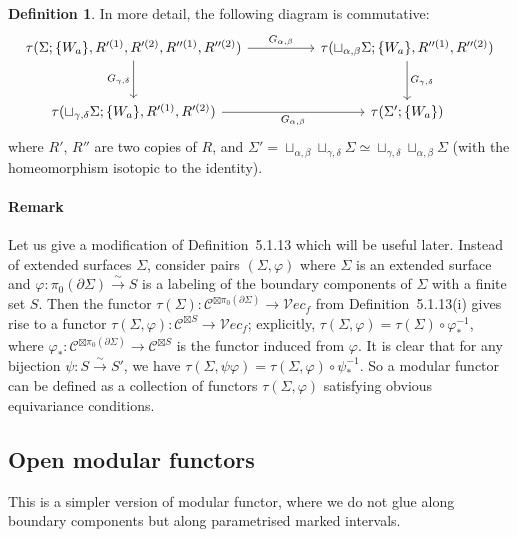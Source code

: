 \documentclass[11pt]{article}
\theoremstyle{definition}
\newtheorem{definition}[theorem]{Definition}
\begin{document}
\begin{definition}
In more detail, the following diagram is commutative:
\[
\begin{tikzcd}[column sep=huge, row sep=large]
\tau(\Sigma; \{W_a\}, R'^{(1)}, R'^{(2)}, R''^{(1)}, R''^{(2)}) \arrow[r, "G_{\alpha,\beta}"] \arrow[d, "G_{\gamma,\delta}"']
& \tau(\sqcup_{\alpha,\beta}\Sigma; \{W_a\}, R''^{(1)}, R''^{(2)}) \arrow[d, "G_{\gamma,\delta}"] \\
\tau(\sqcup_{\gamma,\delta}\Sigma; \{W_a\}, R'^{(1)}, R'^{(2)}) \arrow[r, "G_{\alpha,\beta}"']
& \tau(\Sigma'; \{W_a\})
\end{tikzcd}
\]
where $R'$, $R''$ are two copies of $R$, and $\Sigma' = \sqcup_{\alpha,\beta} \sqcup_{\gamma,\delta} \Sigma \simeq \sqcup_{\gamma,\delta} \sqcup_{\alpha,\beta} \Sigma$ (with the homeomorphism isotopic to the identity).

\paragraph{Remark}
Let us give a modification of Definition~5.1.13 which will be useful later. Instead of extended surfaces $\Sigma$, consider pairs $(\Sigma, \varphi)$ where $\Sigma$ is an extended surface and $\varphi \colon \pi_0(\partial \Sigma) \xrightarrow{\sim} S$ is a labeling of the boundary components of $\Sigma$ with a finite set $S$. Then the functor $\tau(\Sigma) \colon \mathcal{C}^{\boxtimes \pi_0(\partial \Sigma)} \to \mathcal{V}ec_f$ from Definition~5.1.13(i) gives rise to a functor $\tau(\Sigma, \varphi) \colon \mathcal{C}^{\boxtimes S} \to \mathcal{V}ec_f$; explicitly, $\tau(\Sigma, \varphi) = \tau(\Sigma) \circ \varphi_*^{-1}$, where $\varphi_* \colon \mathcal{C}^{\boxtimes \pi_0(\partial \Sigma)} \to \mathcal{C}^{\boxtimes S}$ is the functor induced from $\varphi$. It is clear that for any bijection $\psi \colon S \xrightarrow{\sim} S'$, we have $\tau(\Sigma, \psi\varphi) = \tau(\Sigma, \varphi) \circ \psi_*^{-1}$. So a modular functor can be defined as a collection of functors $\tau(\Sigma, \varphi)$ satisfying obvious equivariance conditions.





\subsection{Open  modular functors}



This is a simpler version of modular functor, where we do not glue along boundary components but along parametrised marked intervals.





\end{definition}
\end{document}
